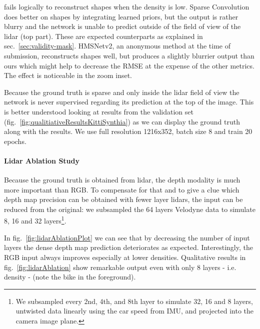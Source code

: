\documentclass[10pt,twocolumn,letterpaper]{article}
\begin{document}
fails logically to reconstruct shapes when the density is low.
Sparse Convolution \cite{uhrig2017sparsity} does better on shapes by integrating learned priors, but the output is rather blurry and the network is unable to predict
outside of the field of view of the lidar (top part). These are expected counterparts as explained in sec.~\ref{sec:validity-mask}.
HMSNetv2, an anonymous method at the time of submission, reconstructs shapes well, but produces a slightly blurrier output than ours which might help to decrease the RMSE at the expense of the other metrics. The effect is noticeable in the zoom inset. 


Because the ground truth is sparse and only inside the lidar field of view the network is never supervised regarding its prediction at the top of the image. This is better understood looking at results from the validation set (fig.~\ref{fig:qualitiativeResultsKittiSynthia}) as we can display the ground truth along with the results. 
We use full resolution 1216x352, batch size 8 and train 20 epochs.

\paragraph{Lidar Ablation Study}
\label{sec:lidarAblationStudy}
Because the ground truth is obtained from lidar, the depth modality is much more important than RGB. To compensate for that and to give a clue which depth map precision can be obtained with fewer layer lidars, the input can be reduced from the original: we subsampled the 64 layers Velodyne data to simulate 8, 16 and 32 layers\footnote{We subsampled every 2nd, 4th, and 8th layer to simulate 32, 16 and 8 layers, untwisted data linearly using the car speed from IMU, and projected into the camera image plane.}.

In fig.~\ref{fig:lidarAblationPlot} we can see that by decreasing the number of input layers the dense depth map prediction deteriorates as expected. Interestingly, the RGB input always improves especially at lower densities.
Qualitative results in fig.~\ref{fig:lidarAblation} show remarkable output even with only 8 layers - i.e.  density - (note the bike in the foreground).
\end{document}
